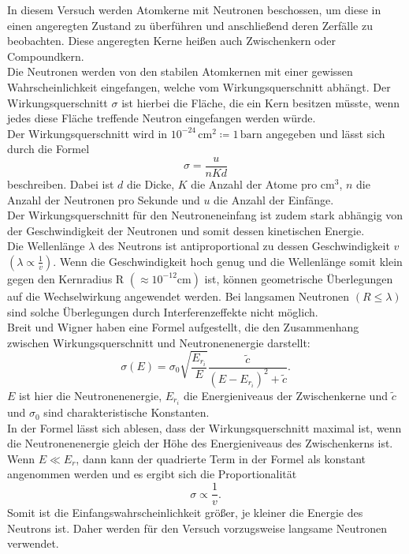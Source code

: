 In diesem Versuch werden Atomkerne mit Neutronen beschossen, um diese in einen angeregten Zustand zu überführen
und anschließend deren Zerfälle zu beobachten. Diese angeregten Kerne heißen auch Zwischenkern oder Compoundkern.\\
Die Neutronen werden von den stabilen Atomkernen mit einer gewissen Wahrscheinlichkeit eingefangen, welche vom 
Wirkungsquerschnitt abhängt. Der Wirkungsquerschnitt $\sigma$ ist hierbei die Fläche, die ein Kern besitzen müsste, 
wenn jedes diese Fläche treffende Neutron eingefangen werden würde.\\
Der Wirkungsquerschnitt wird in $10^{-24} \, \si{\centi\metre\squared} \coloneqq 1 \, \mathrm{barn}$ angegeben und
lässt sich durch die Formel
\begin{equation}
    \label{eqn:Sigma}
    \sigma = \frac{u}{nKd}
\end{equation}
beschreiben. Dabei ist $d$ die Dicke, $K$ die Anzahl der Atome pro $\unit{\centi\meter^3}$, $n$ die Anzahl der
Neutronen pro Sekunde und $u$ die Anzahl der Einfänge.\\
Der Wirkungsquerschnitt für den Neutroneneinfang ist zudem stark abhängig von der Geschwindigkeit der Neutronen und
somit dessen kinetischen Energie. \\
Die Wellenlänge $\lambda$ des Neutrons ist antiproportional zu dessen Geschwindigkeit $v$ $ \left(\lambda \propto \frac{1}{v}\right)$.
Wenn die Geschwindigkeit hoch genug und die Wellenlänge somit klein gegen den Kernradius R $\left(\approx 10^{-12} \si{\centi\metre}\right)$ ist,
können geometrische Überlegungen auf die Wechselwirkung angewendet werden. Bei langsamen Neutronen $\left(R \leq \lambda\right)$ sind solche
Überlegungen durch Interferenzeffekte nicht möglich.\\
Breit und Wigner haben eine Formel aufgestellt, die den Zusammenhang zwischen Wirkungsquerschnitt und Neutronenenergie
darstellt:
\begin{equation}
    \label{eqn:SigmaE}
    \sigma (E) = \sigma_0 \sqrt{\frac{E_{r_i}}{E}} \frac{\tilde{c}}{(E - E_{r_i})^2 + \tilde{c}} .
\end{equation}
$E$ ist hier die Neutronenenergie, $E_{r_i}$ die Energieniveaus der Zwischenkerne und $\tilde{c}$ und $\sigma_0$ sind charakteristische Konstanten.\\
In der Formel lässt sich ablesen, dass der Wirkungsquerschnitt maximal ist, wenn die Neutronenenergie gleich der Höhe des Energieniveaus
des Zwischenkerns ist.\\
Wenn $E \ll E_r$, dann kann der quadrierte Term in der Formel als konstant angenommen werden und es ergibt sich die Proportionalität
\begin{equation*}
    \sigma \propto \frac{1}{v}.
\end{equation*}
Somit ist die Einfangswahrscheinlichkeit größer, je kleiner die Energie des Neutrons ist. Daher werden für den Versuch vorzugsweise
langsame Neutronen verwendet.\\

